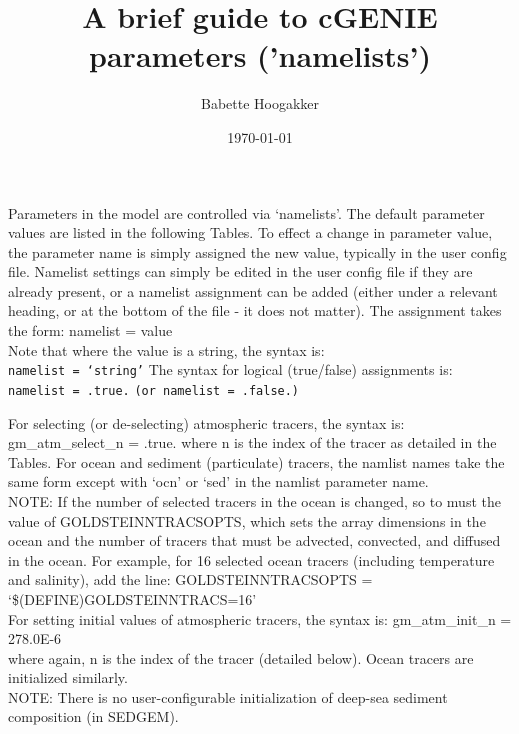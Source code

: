 \documentclass[english,10pt,twoside]{article}
\title{A brief guide to cGENIE parameters ('namelists')}
\author{Babette Hoogakker}
\date{\today}
\begin{document}

\maketitle



Parameters in the model are controlled via `namelists'. The default parameter values are listed in the following Tables. To effect a change in parameter value, the parameter name is simply assigned the new value, typically in the user config file.
Namelist settings can simply be edited in the user config file if they are already present, or a namelist assignment can be added (either under a relevant heading, or at the bottom of the file - it does not matter). The assignment takes the form:
namelist = value\\
Note that where the value is a string, the syntax is:\\
\texttt{namelist = `string'}
The syntax for logical (true/false) assignments is:\\
\texttt{namelist = .true.}
\texttt{(or namelist = .false.)}

For selecting (or de-selecting) atmospheric tracers, the syntax is: gm\_atm\_select\_n = .true.
where n is the index of the tracer as detailed in the Tables. For ocean and sediment (particulate) tracers, the namlist names take the same form except with `ocn' or `sed' in the namlist parameter name.\\

NOTE: If the number of selected tracers in the ocean is changed, so to must the value of GOLDSTEINNTRACSOPTS, which sets the array dimensions in the ocean and the number of tracers that must be advected, convected, and diffused in the
ocean. For example, for 16 selected ocean tracers (including temperature and salinity), add the line:
GOLDSTEINNTRACSOPTS = `\$(DEFINE)GOLDSTEINNTRACS=16'\\

For setting initial values of atmospheric tracers, the syntax is:
gm\_atm\_init\_n = 278.0E-6\\
where again, n is the index of the tracer (detailed below). Ocean tracers are initialized similarly.\\
NOTE: There is no user-configurable initialization of deep-sea sediment composition (in SEDGEM).\\
\end{document}
